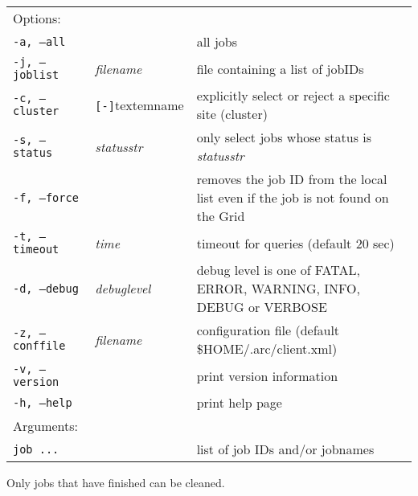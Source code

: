 \hspace*{0.5cm}
\begin{shaded}
\end{shaded}
\begin{longtable}{llp{8cm}}
   Options:&&\\
   \texttt{-a, --all}& & all jobs\\
   \texttt{-j, --joblist}& \textit{filename} & file containing a list of jobIDs\\
   \texttt{-c, --cluster}&\verb#[-]#textem{name}&explicitly select or reject a specific site (cluster)\\
   \texttt{-s, --status}& \textit{statusstr} &only select jobs whose status is \textit{statusstr}\\
   \texttt{-f, --force} & & removes the job ID from the local list even if the job is not found on the Grid\\
   \texttt{-t, --timeout}& \textit{time} & timeout for queries (default 20 sec)\\
   \texttt{-d, --debug}& \textit{debuglevel}&debug level is one of  FATAL, ERROR, WARNING, INFO, DEBUG or VERBOSE\\
   \texttt{-z, --conffile}&\textit{filename}& configuration file (default {\$}HOME/.arc/client.xml)\\
   \texttt{-v, --version}& & print version information\\
   \texttt{-h, --help}& & print help page\\
   Arguments:&&\\
   \texttt{job ...} && list of job IDs and/or jobnames\\
\end{longtable}

Only jobs that have finished can be cleaned.


